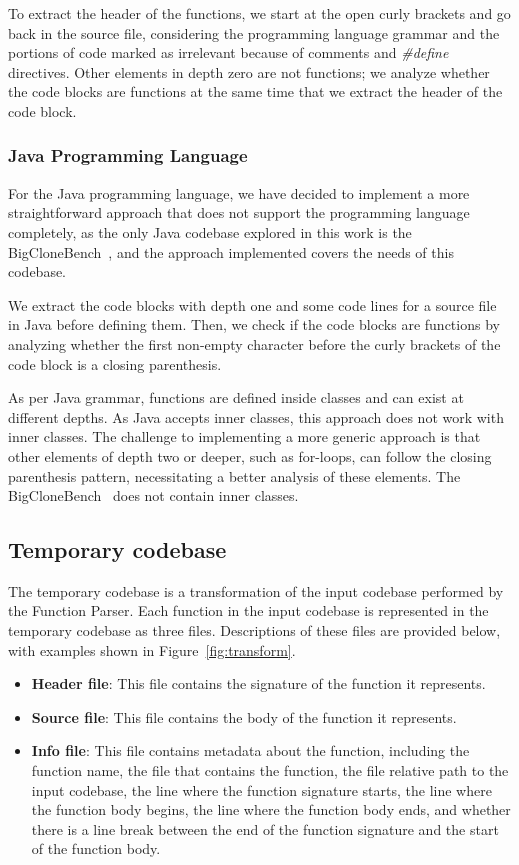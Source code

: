 To extract the header of the functions, we start at the open curly brackets and go back in the 
source file, considering the programming language grammar and the portions of code 
marked as irrelevant because of comments and \textit{\#define} directives.
Other elements in depth zero are not functions; we analyze whether the code blocks 
are functions at the same time that we extract the header of the code block.

\subsubsection{Java Programming Language}

For the Java programming language, we have decided to implement a more straightforward approach 
that does not support the programming language completely, as the only Java codebase explored in 
this work is the BigCloneBench~\citep{bigclonebench}, and the approach implemented covers the 
needs of this codebase.

We extract the code blocks with depth one and some code lines for a source file in Java before 
defining them. Then, we check if the code blocks are functions by analyzing whether the first 
non-empty character before the curly brackets of the code block is a closing parenthesis.

As per Java grammar, functions are defined inside classes and can exist at different depths. 
As Java accepts inner classes, this approach does not work with inner classes. The challenge 
to implementing a more generic approach is that other elements of depth two or deeper, such 
as for-loops, can follow the closing parenthesis pattern, necessitating a better analysis of 
these elements. The BigCloneBench~\citep{bigclonebench} does not contain inner classes.

\subsection{Temporary codebase}

The temporary codebase is a transformation of the input codebase performed by the Function Parser. Each function in the input codebase is represented in the temporary codebase as three files. Descriptions of these files are provided below, with examples shown in Figure~\ref{fig:transform}.

\begin{itemize}
	\item \textbf{Header file}: This file contains the signature of the function it represents.
	\item \textbf{Source file}: This file contains the body of the function it represents.
	\item \textbf{Info file}: This file contains metadata about the function, including the function name, the file that contains the function, the file relative path to the input codebase, the line where the function signature starts, the line where the function body begins, the line where the function body ends, and whether there is a line break between the end of the function signature and the start of the function body.
\end{itemize}

